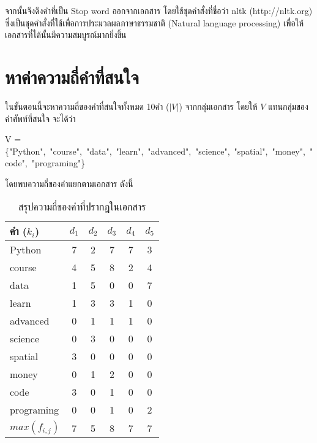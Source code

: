 \documentclass[11pt,a4paper]{article}
\newcommand{\numberOfCollection}{10}
\newcommand{\fir}{Python}
\newcommand{\seco}{course}
\newcommand{\thi}{data}
\newcommand{\fou}{learn}
\newcommand{\fif}{advanced}
\newcommand{\six}{science}
\newcommand{\sev}{spatial}
\newcommand{\eig}{money}
\newcommand{\nin}{code}
\newcommand{\ten}{programing}
\begin{document}
    จากนั้นจึงดึงคำที่เป็น Stop word ออกจากเอกสาร โดยใช้ชุดคำสั่งที่ชื่อว่า nltk (http://nltk.org) ซึ่งเป็นชุดคำสั่งที่ใช้เพื่อการประมวลผลภาษาธรรมชาติ (Natural language processing) เพื่อให้เอกสารที่ได้นั้นมีความสมบูรณ์มากยิ่งขึ้น

    \clearpage
    \section{หาค่าความถี่คำที่สนใจ}
    ในขั้นตอนนี้จะหาความถี่ของคำที่สนใจทั้งหมด \numberOfCollection คำ ($|V|$) จากกลุ่มเอกสาร โดยให้ $V$ แทนกลุ่มของคำศัพท์ที่สนใจ จะได้ว่า  \\ 
    {V = \{"{\fir}",\ "{\seco}",\ "{\thi}",\ "{\fou}",\ "{\fif}",\ "{\six}",\ "{\sev}",\ "{\eig}",\ "{\nin}",\ "{\ten}"\}

    โดยพบความถี่ของคำแยกตามเอกสาร ดังนี้
    \begin{table}[ht!]
        \centering
        \caption{สรุปความถี่ของคำที่ปรากฎในเอกสาร}
        \label{tab:freq}
        \begin{tabular}{ p{3cm}ccccc}
            \hline
            คำ ($k_i$)      & $d_1$ &  $d_2$    &  $d_3$    &  $d_4$    &  $d_5$ \\
            \hline \hline
            \fir            & 7     &  2        &  7        &  7        &  3  \\
            \seco           & 4     &  5        &  8        &  2        &  4  \\
            \thi            & 1     &  5        &  0        &  0        &  7  \\
            \fou            & 1     &  3        &  3        &  1        &  0  \\
            \fif            & 0     &  1        &  1        &  1        &  0  \\
            \six            & 0     &  3        &  0        &  0        &  0  \\
            \sev            & 3     &  0        &  0        &  0        &  0  \\
            \eig            & 0     &  1        &  2        &  0        &  0  \\
            \nin            & 3     &  0        &  1        &  0        &  0 \\
            \ten            & 0     &  0        &  1        &  0        &  2  \\
            \hline 
            $max(f_{i,j})$  & 7     &  5        &  8        &  7        &  7  \\
            \hline
        \end{tabular}
    \end{table}

}
\end{document}
